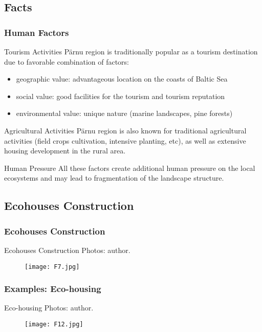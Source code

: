 \documentclass[pdflatex,compress,8pt,
	xcolor={dvipsnames,dvipsnames,svgnames,x11names,table},
	hyperref={	
	breaklinks = true, 
	pdfauthor={Lemenkova Polina}, 
	pdfsubject={Preentation}, 
	pdfcreator={Lemenkova Polina}, 
	pdfproducer={Lemenkova Polina}, 
	colorlinks=true,
	linkcolor=Tomato, 
	citecolor=DeepPink3, 
	urlcolor = NavyBlue, 
	breaklinks = true}]{beamer}
\begin{document}
\subsection{Facts}
\begin{frame}\frametitle{Human Factors}

\begin{block}{Tourism Activities}
P\"{a}rnu region is traditionally popular as a \alert{tourism destination} due to favorable combination of factors:
\begin{itemize}
	\item geographic value: advantageous location on the coasts of Baltic Sea
	\item social value: good facilities for the tourism and tourism reputation
	\item environmental value: unique nature (marine landscapes, pine forests)
\end{itemize}
\end{block}

\begin{block}{Agricultural Activities}
P\"{a}rnu region is also known for traditional \alert{agricultural activities} (field crops cultivation, intensive planting, etc), as well as extensive \alert{housing development} in the rural area.
\end{block}

\begin{alertblock}{Human Pressure}
All these factors create additional human pressure on the local ecosystems and may lead to fragmentation of the landscape structure.
\end{alertblock}
\end{frame}

\subsection{Ecohouses Construction}
\begin{frame}\frametitle{Ecohouses Construction}
\vspace{3em}
\begin{examples}{Ecohouses Construction}
Photos: author.
\end{examples}
\begin{figure}[H]
	\centering
		\texttt{[image: F7.jpg]}
\end{figure}
\end{frame}

\begin{frame}\frametitle{Examples: Eco-housing}
\begin{examples}{Eco-housing}
Photos: author.
\end{examples}
\begin{figure}[H]
	\centering
		\texttt{[image: F12.jpg]}
\end{figure}
\end{frame}
         
\end{document}
